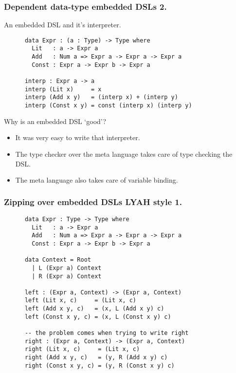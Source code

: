 \documentclass{beamer}
\begin{document}
\begin{frame}[fragile]
  \frametitle{Dependent data-type embedded DSLs 2.}
  \begin{block}{An embedded DSL and it's interpreter.}
    \begin{verbatim}
      data Expr : (a : Type) -> Type where
        Lit   : a -> Expr a
        Add   : Num a => Expr a -> Expr a -> Expr a
        Const : Expr a -> Expr b -> Expr a

      interp : Expr a -> a
      interp (Lit x)     = x
      interp (Add x y)   = (interp x) + (interp y)
      interp (Const x y) = const (interp x) (interp y)
    \end{verbatim}
  \end{block}
  \begin{block}{Why is an embedded DSL `good'?}
    \begin{itemize}
      \item It was very easy to write that interpreter.
      \item The type checker over the meta language takes care of
        type checking the DSL.
      \item The meta language also takes care of variable binding.
    \end{itemize}
  \end{block}
\end{frame}

\begin{frame}[fragile]
\frametitle{Zipping over embedded DSLs LYAH style 1.}
    \begin{verbatim}
      data Expr : Type -> Type where
        Lit   : a -> Expr a
        Add   : Num a => Expr a -> Expr a -> Expr a
        Const : Expr a -> Expr b -> Expr a

      data Context = Root
        | L (Expr a) Context
        | R (Expr a) Context

      left : (Expr a, Context) -> (Expr a, Context)
      left (Lit x, c)     = (Lit x, c)
      left (Add x y, c)   = (x, L (Add x y) c)
      left (Const x y, c) = (x, L (Const x y) c)

      -- the problem comes when trying to write right
      right : (Expr a, Context) -> (Expr a, Context)
      right (Lit x, c)     = (Lit x, c)
      right (Add x y, c)   = (y, R (Add x y) c)
      right (Const x y, c) = (y, R (Const x y) c)
    \end{verbatim}
\end{frame}
\end{document}
